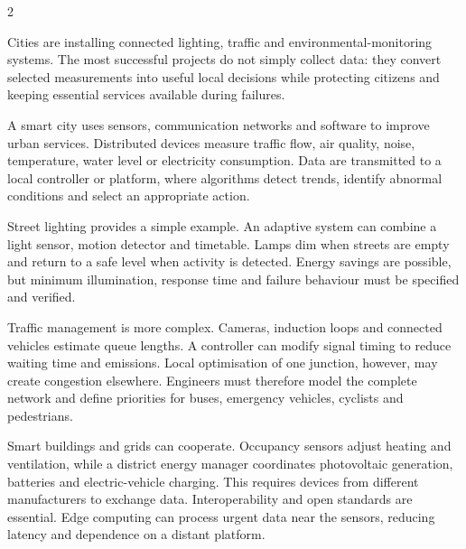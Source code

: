 

\begin{multicols}{2}
\begin{engineeringnews}
Cities are installing connected lighting, traffic and environmental-monitoring systems. The most
successful projects do not simply collect data: they convert selected measurements into useful local
decisions while protecting citizens and keeping essential services available during failures.
\end{engineeringnews}

\begin{ecarticle}
A smart city uses sensors, communication networks and software to improve urban services. Distributed
devices measure traffic flow, air quality, noise, temperature, water level or electricity
consumption. Data are transmitted to a local controller or platform, where algorithms detect trends,
identify abnormal conditions and select an appropriate action.

Street lighting provides a simple example. An adaptive system can combine a light sensor, motion
detector and timetable. Lamps dim when streets are empty and return to a safe level when activity is
detected. Energy savings are possible, but minimum illumination, response time and failure behaviour
must be specified and verified.

Traffic management is more complex. Cameras, induction loops and connected vehicles estimate queue
lengths. A controller can modify signal timing to reduce waiting time and emissions. Local
optimisation of one junction, however, may create congestion elsewhere. Engineers must therefore
model the complete network and define priorities for buses, emergency vehicles, cyclists and
pedestrians.

Smart buildings and grids can cooperate. Occupancy sensors adjust heating and ventilation, while a
district energy manager coordinates photovoltaic generation, batteries and electric-vehicle
charging. This requires devices from different manufacturers to exchange data. Interoperability and
open standards are essential. Edge computing can process urgent data near the sensors, reducing
latency and dependence on a distant platform.


\end{ecarticle}
\end{multicols}
